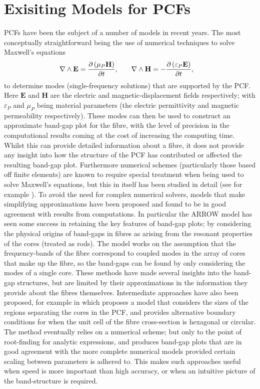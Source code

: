 \section{Exisiting Models for PCFs} \label{sec:ExistingPCFModels}
PCFs have been the subject of a number of models in recent years. 
The most conceptually straightforward being the use of numerical techniques to solve Maxwell's equations
\begin{align*}
	\nabla\wedge\mathbf{E} &= \dfrac{\partial \left( \mu_{P}\mathbf{H} \right)}{\partial t}, 
	&\quad \nabla\wedge\mathbf{H} &= -\dfrac{\partial \left( \varepsilon_{P}\mathbf{E} \right)}{\partial t},	
\end{align*} 
to determine modes (single-frequency solutions) that are supported by the PCF.
Here $\mathbf{E}$ and $\mathbf{H}$ are the electric and magnetic-displacement fields respectively; with $\varepsilon_{P}$ and $\mu_{P}$ being material parameters (the electric permittivity and magnetic permeability respectively).
These modes can then be used to construct an approximate band-gap plot for the fibre, with the level of precision in the computational results coming at the cost of increasing the computing time.
Whilst this can provide detailed information about a fibre, it does not provide any insight into how the structure of the PCF has contributed or affected the resulting band-gap plot.
Furthermore numerical schemes (particularly those based off finite elements) are known to require special treatment when being used to solve Maxwell's equations, but this in itself has been studied in detail (see for example \cite{monk2003finite}).
To avoid the need for complex numerical solvers, models that make simplifying approximations have been proposed and found to be in good agreement with results from computations.
In particular the ARROW model  has seen some success in retaining the key features of band-gap plots; by considering the physical origins of band-gaps in fibres as arising from the resonant properties of the cores (treated as rods).
The model works on the assumption that the frequency-bands of the fibre correspond to coupled modes in the array of cores that make up the fibre, so the band-gaps can be found by only considering the modes of a single core.
These methods have made several insights into the band-gap structures, but are limited by their approximations in the information they provide about the fibres themselves.
Intermediate approaches have also been proposed, for example in \cite{birks2006approximate} which proposes a model that considers the sizes of the regions separating the cores in the PCF, and provides alternative boundary conditions for when the unit cell of the fibre cross-section is hexagonal or circular.
The method eventually relies on a numerical scheme; but only to the point of root-finding for analytic expressions, and produces band-gap plots that are in good agreement with the more complete numerical models provided certain scaling between parameters is adhered to.
This makes such approaches useful when speed is more important than high accuracy, or when an intuitive picture of the band-structure is required. \newline

